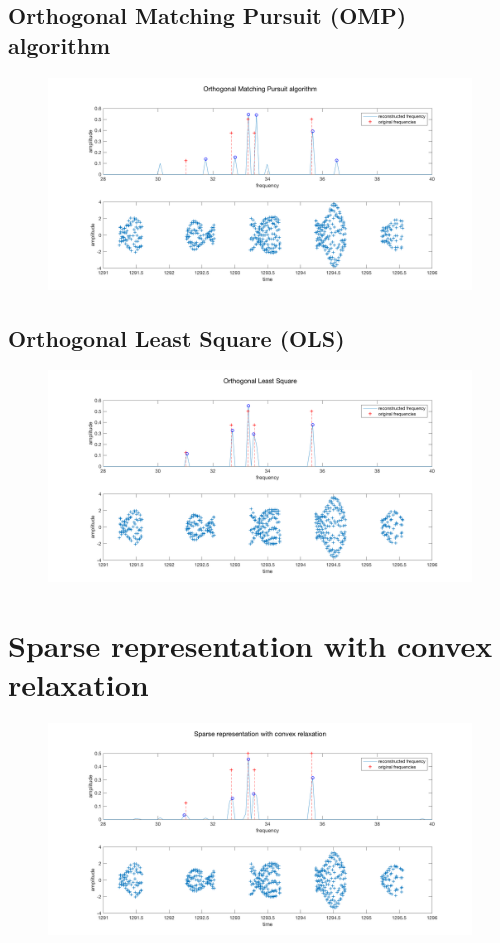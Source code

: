 \subsection{Orthogonal Matching Pursuit (OMP) algorithm}
\begin{figure}[h!]
	\centering
	\includegraphics[width=\textwidth-3em]{images/omp}
	\caption{}
	\label{fig:omp}
\end{figure}


\subsection{Orthogonal Least Square (OLS)}
\begin{figure}[h!]
	\centering
	\includegraphics[width=\textwidth-3em]{images/ols}
	\caption{}
	\label{fig:ols}
\end{figure}




\section{Sparse representation with convex relaxation}

\begin{figure}[h!]
	\centering
	\includegraphics[width=\textwidth-3em]{images/convex}
	\caption{}
	\label{fig:convex}
\end{figure}

